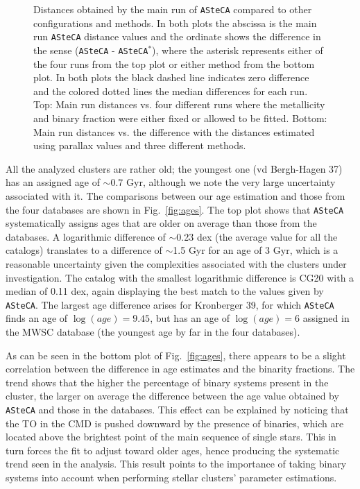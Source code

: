 \documentclass{aa}
\begin{document}
  \begin{figure}
   \caption{Distances obtained by the main run of \texttt{ASteCA} compared to
   other configurations and methods.   
   In both plots the abscissa is the main run \texttt{ASteCA} distance values
   and the ordinate shows the difference in the sense (\texttt{ASteCA} - 
   \texttt{ASteCA}$^*$), where the asterisk represents either of the four runs
   from the top plot or either method from the bottom plot.
   In both plots the black dashed line indicates zero difference and the colored
   dotted lines  the median differences for each run.
   Top: Main run distances vs. four different runs where the metallicity and
   binary fraction were either fixed or allowed to be fitted.
   Bottom: Main run distances vs. the difference with the distances
   estimated using parallax values and three different methods.}
   \label{fig:dist_comparisions}
  \end{figure}

  All the analyzed clusters are rather old;  the youngest one (vd
  Bergh-Hagen 37) has an assigned   age of $\sim0.7$ Gyr, although we note the very
  large uncertainty associated with it.
  The comparisons between our age estimation and those from
  the four databases are shown in Fig.~\ref{fig:ages}. The top plot
  shows that \texttt{ASteCA} systematically assigns ages that are older on
  average than those from the databases.
  A logarithmic difference of $\sim$0.23 dex (the average value for
  all the catalogs) translates to a difference of $\sim$1.5 Gyr for
  an age of 3 Gyr, which is a reasonable uncertainty given the complexities
  associated with the clusters under investigation. The catalog with the
  smallest logarithmic difference is CG20 with a median of 0.11 dex, again
  displaying the best match to the values given by \texttt{ASteCA}.
  The largest age difference arises for Kronberger 39, for
  which \texttt{ASteCA} finds an age of $\log(age)=9.45$, but has an age of
  $\log(age)=6$ assigned in the MWSC database (the youngest age by far in the four
  databases).

  As can be seen in the bottom plot of Fig.~\ref{fig:ages}, there appears to be
  a slight correlation between the difference in age estimates and the
  binarity fractions. The trend shows that the higher the percentage of
  binary systems present in the cluster, the larger on average   the difference
  between the age value obtained by \texttt{ASteCA} and those in the
  databases. This  effect can be explained by noticing that the TO in the CMD
  is pushed downward by the presence of binaries, which are located above the
  brightest point of the main sequence of single stars. This in turn forces the
  fit to adjust toward  older ages, hence producing the systematic trend
  seen in the analysis. This result points to the importance of taking binary
  systems into account when performing stellar clusters' parameter estimations.
  \\
\end{document}
